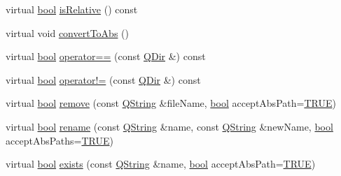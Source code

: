 \begin{DoxyCompactItemize}
virtual \hyperlink{qglobal_8h_a1062901a7428fdd9c7f180f5e01ea056}{bool} \hyperlink{class_q_dir_a0d7232dab091230bfabb81ba2d2329ef}{is\+Relative} () const 
\item 
virtual void \hyperlink{class_q_dir_a0c05c8978b3b4158233f809e4d30c55d}{convert\+To\+Abs} ()
\item 
virtual \hyperlink{qglobal_8h_a1062901a7428fdd9c7f180f5e01ea056}{bool} \hyperlink{class_q_dir_a4d2c37c4d14327b0966f7a0017e4a8d6}{operator==} (const \hyperlink{class_q_dir}{Q\+Dir} \&) const 
\item 
virtual \hyperlink{qglobal_8h_a1062901a7428fdd9c7f180f5e01ea056}{bool} \hyperlink{class_q_dir_a197368441ba4e956e4b9707471196cce}{operator!=} (const \hyperlink{class_q_dir}{Q\+Dir} \&) const 
\item 
virtual \hyperlink{qglobal_8h_a1062901a7428fdd9c7f180f5e01ea056}{bool} \hyperlink{class_q_dir_aca44a22e3f1355bc74fdd96e0af052c9}{remove} (const \hyperlink{class_q_string}{Q\+String} \&file\+Name, \hyperlink{qglobal_8h_a1062901a7428fdd9c7f180f5e01ea056}{bool} accept\+Abs\+Path=\hyperlink{qglobal_8h_a04a6422a52070f0dc478693da640242b}{T\+R\+U\+E})
\item 
virtual \hyperlink{qglobal_8h_a1062901a7428fdd9c7f180f5e01ea056}{bool} \hyperlink{class_q_dir_a403c5efd21e686cadee2cf4d7059ab19}{rename} (const \hyperlink{class_q_string}{Q\+String} \&name, const \hyperlink{class_q_string}{Q\+String} \&new\+Name, \hyperlink{qglobal_8h_a1062901a7428fdd9c7f180f5e01ea056}{bool} accept\+Abs\+Paths=\hyperlink{qglobal_8h_a04a6422a52070f0dc478693da640242b}{T\+R\+U\+E})
\item 
virtual \hyperlink{qglobal_8h_a1062901a7428fdd9c7f180f5e01ea056}{bool} \hyperlink{class_q_dir_a83bb64d2d9e4f7bf0d9d9d0896165be6}{exists} (const \hyperlink{class_q_string}{Q\+String} \&name, \hyperlink{qglobal_8h_a1062901a7428fdd9c7f180f5e01ea056}{bool} accept\+Abs\+Path=\hyperlink{qglobal_8h_a04a6422a52070f0dc478693da640242b}{T\+R\+U\+E})
\end{DoxyCompactItemize}
